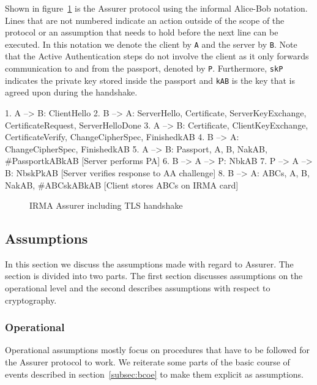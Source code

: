 Shown in figure~\ref{fig:assurer} is the Assurer protocol using the informal Alice-Bob notation. Lines that are not numbered indicate an action outside of the scope of the protocol or an assumption that needs to hold before the next line can be executed. In this notation we denote the client by \texttt{A} and the server by \texttt{B}. Note that the Active Authentication steps do not involve the client as it only forwards communication to and from the passport, denoted by \texttt{P}. Furthermore, \texttt{skP} indicates the private key stored inside the passport and \texttt{kAB} is the key that is agreed upon during the handshake.

\begin{verbbox}
1. A --> B: ClientHello
2. B --> A: ServerHello, Certificate, ServerKeyExchange, 
            CertificateRequest, ServerHelloDone
3. A --> B: Certificate, ClientKeyExchange, CertificateVerify, 
            ChangeCipherSpec, {Finished}kAB
4. B --> A: ChangeCipherSpec, {Finished}kAB
5. A --> B: {{Passport, A, B, Na}kAB, #{Passport}kAB}kAB
   [Server performs PA]  
6. B --> A --> P: {Nb}kAB
7. P --> A --> B: {{Nb}skP}kAB
   [Server verifies response to AA challenge]  
8. B --> A: {{ABCs, A, B, Na}kAB, #{ABCs}kAB}kAB
   [Client stores ABCs on IRMA card]
\end{verbbox}

\begin{figure}[htb]
\centering
\theverbbox
\caption{IRMA Assurer including TLS handshake}
\label{fig:assurer}
\end{figure}

\subsection{Assumptions}
\label{sec:assumptions}
In this section we discuss the assumptions made with regard to Assurer. The section is divided into two parts. The first section discusses assumptions on the operational level and the second describes assumptions with respect to cryptography.

\subsubsection{Operational}
Operational assumptions mostly focus on procedures that have to be followed for the Assurer protocol to work. We reiterate some parts of the basic course of events described in section~\ref{subsec:bcoe} to make them explicit as assumptions. 

